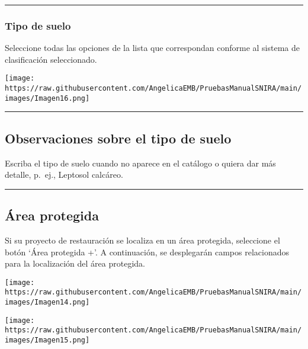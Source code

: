 \documentclass[
]{book}
\begin{document}
\begin{center}\rule{0.5\linewidth}{0.5pt}\end{center}

\hypertarget{tipo-de-suelo-1}{%
\subsubsection*{Tipo de suelo}\label{tipo-de-suelo-1}}

Seleccione todas las opciones de la lista que correspondan conforme al sistema de clasificación seleccionado.

\texttt{[image: https://raw.githubusercontent.com/AngelicaEMB/PruebasManualSNIRA/main/images/Imagen16.png]}

\begin{center}\rule{0.5\linewidth}{0.5pt}\end{center}

\hypertarget{observaciones-sobre-el-tipo-de-suelo}{%
\subsection*{Observaciones sobre el tipo de suelo}\label{observaciones-sobre-el-tipo-de-suelo}}

Escriba el tipo de suelo cuando no aparece en el catálogo o quiera dar más detalle, p.~ej., Leptosol calcáreo.

\begin{center}\rule{0.5\linewidth}{0.5pt}\end{center}

\hypertarget{uxe1rea-protegida}{%
\subsection*{Área protegida}\label{uxe1rea-protegida}}

Si su proyecto de restauración se localiza en un área protegida, seleccione el botón `Área protegida +'. A continuación, se desplegarán campos relacionados para la localización del área protegida.

\texttt{[image: https://raw.githubusercontent.com/AngelicaEMB/PruebasManualSNIRA/main/images/Imagen14.png]}

\texttt{[image: https://raw.githubusercontent.com/AngelicaEMB/PruebasManualSNIRA/main/images/Imagen15.png]}
\end{document}
